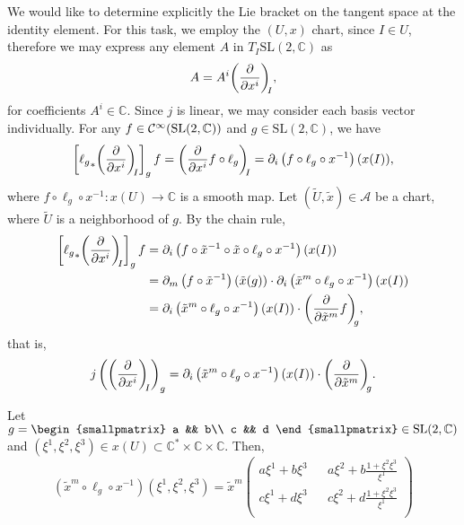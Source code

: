 We would like to determine explicitly the Lie bracket on the tangent space at the identity element. For this task, we employ the \((U,x)\) chart, since \(I \in U\), therefore we may express any element \(A\) in \(T_I\mathrm{SL}(2,\mathbb{C})\) as
\begin{equation*}
    A = A^i \bvec{x^i}{I},
\end{equation*}
for coefficients \(A^i \in \mathbb{C}.\) Since \(j\) is linear, we may consider each basis vector individually. For any \(f \in \mathcal{C}^\infty(\mathrm{SL}(2, \mathbb{C}))\) and \(g \in \mathrm{SL}(2,\mathbb{C})\), we have
\begin{equation*}
    \left[\pf{\ell_g}\bvec{x^i}{I}\right]_{g}f = \bvec[{f \circ \ell_g}]{x^i}{I} = \partial_i \left(f \circ \ell_g \circ x^{-1}\right) (x(I)),
\end{equation*}
where \(f \circ \ell_g \circ x^{-1} : x(U) \to \mathbb{C}\) is a smooth map. Let \((\tilde{U}, \tilde{x}) \in \mathscr{A}\) be a chart, where \(\tilde{U}\) is a neighborhood of \(g\). By the chain rule,
\begin{align*}
    \left[\pf{\ell_g}\bvec{x^i}{I}\right]_{g}f  &= \partial_i \left(f \circ \tilde{x}^{-1} \circ\tilde{x} \circ \ell_g \circ x^{-1}\right) (x(I))\\
                                                &= \partial_m \left(f \circ \tilde{x}^{-1}\right)(\tilde{x}(g))\cdot \partial_i\left(\tilde{x}^m \circ \ell_g \circ x^{-1}\right)(x(I))\\
                                                &= \partial_i \left(\tilde{x}^m \circ \ell_g \circ x^{-1}\right) (x(I))\cdot \bvec[f]{\tilde{x}^m}{g},
\end{align*}
that is,
\begin{equation*}
    j\left(\bvec{x^i}{I}\right)_g = \partial_i \left(\tilde{x}^m \circ \ell_g \circ x^{-1}\right)(x(I)) \cdot \bvec{\tilde{x}^m}{g}.
\end{equation*}

Let \(g = \begin{smallpmatrix}
    a && b\\
    c && d
\end{smallpmatrix}\in \mathrm{SL}(2,\mathbb{C})\) and \(\left(\xi^1,\xi^2,\xi^3\right) \in x(U) \subset \mathbb{C}^{\ast}\times \mathbb{C}\times \mathbb{C}\). Then,
\begin{equation*}
    \left(\tilde{x}^m \circ \ell_g \circ x^{-1}\right)(\xi^1, \xi^2, \xi^3) = \tilde{x}^m\begin{pmatrix}
        a\xi^1 + b\xi^3 && a\xi^2 + b\frac{1 + \xi^2\xi^3}{\xi^1}\\
        c\xi^1 + d\xi^3 && c\xi^2 + d\frac{1 + \xi^2\xi^3}{\xi^1}\\
    \end{pmatrix}
\end{equation*}

